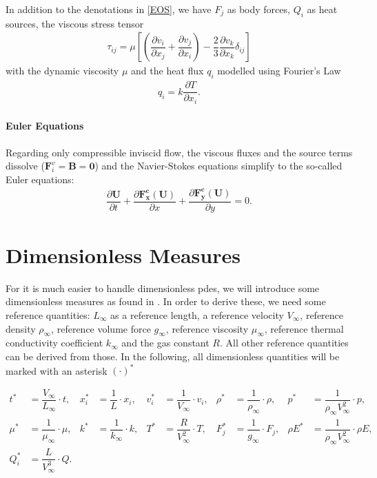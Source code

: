 		In addition to the denotations in \cref{EOS}, we have $F_j$ as body forces, $Q_i$ as heat sources, the viscous stress tensor
		\begin{align}
			\tau_{ij} = \mu \left[\left(\dfrac{\partial v_i}{\partial x_j} + \dfrac{\partial v_j}{\partial x_i} \right) - \dfrac{2}{3} \dfrac{\partial v_k}{\partial x_k} \delta_{ij}\right]
		\end{align}
		with the dynamic viscosity $\mu$ and the heat flux $q_i$ modelled using Fourier's Law
		\begin{align}
			q_i = k \dfrac{\partial T}{\partial x_i}.
		\end{align}
		
			\paragraph{Euler Equations}
			Regarding only compressible inviscid flow, the viscous fluxes and the source terms dissolve ($\mathbf{F}_i^v = \mathbf{B} = \mathbf{0}$) and the Navier-Stokes equations simplify to the so-called Euler equations: 
			\begin{align}
				\dfrac{\partial \mathbf{U}}{\partial t} + \dfrac{\partial \mathbf{F_x^c(U)}}{\partial x} + \dfrac{\partial \mathbf{F_y^c(U)}}{\partial y} = 0.
			\end{align}
	
	
	\section{Dimensionless Measures}
	For it is much easier to handle dimensionless \glspl{pde}, we will introduce some dimensionless measures as found in \textcite{annualreport}. In order to derive these, we need some reference quantities: $L_\infty$ as a reference length, a reference velocity $V_\infty$, reference density $\rho_\infty$, reference volume force $g_\infty$, reference viscosity $\mu_\infty$, reference thermal conductivity coefficient $k_\infty$ and the gas constant $R$. All other reference quantities can be derived from those. In the following, all dimensionless quantities will be marked with an asterisk $(\cdot)^*$
	
	\begin{align}
		t^* &= \dfrac{V_\infty}{L_\infty} \cdot t,& x_i^* &= \dfrac{1}{L} \cdot x_i, & v_i^* &= \dfrac{1}{V_\infty}\cdot v_i, & \rho^* &= \dfrac{1}{\rho_\infty} \cdot \rho, & p^* &= \dfrac{1}{\rho_\infty V_\infty^2} \cdot p, \\ \nonumber
		 \mu^* &= \dfrac{1}{\mu_\infty} \cdot \mu , & k^* &= \dfrac{1}{k_\infty} \cdot k,&  T^* &= \dfrac{R}{V_\infty^2}\cdot T, & F_j^*& = \dfrac{1}{g_\infty} \cdot F_j, & \rho E^* &= \dfrac{1}{\rho_\infty V_\infty^2} \cdot \rho E, \\ \nonumber
		 Q_i^* &= \dfrac{L}{V_\infty^3} \cdot Q. &
	\end{align}
	
